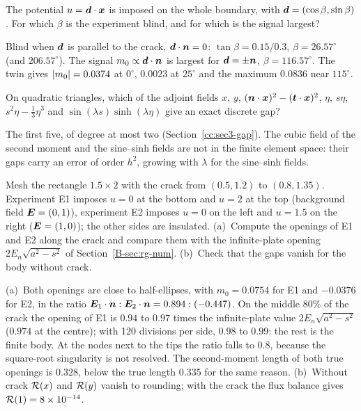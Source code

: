 \label{exo:cc-rg-q-blind}
%
The potential $u=\bm{d}\cdot\bm{x}$ is imposed on the whole boundary, with
$\bm{d}=(\cos\beta,\sin\beta)$. For which $\beta$ is the experiment blind, and for
which is the signal largest?
\begin{solution}
Blind when $\bm{d}$ is parallel to the crack, $\bm{d}\cdot\bm{n}=0$:
$\tan\beta=0.15/0.3$, $\beta=26.57^\circ$ (and $206.57^\circ$). The signal
$m_0\propto\bm{d}\cdot\bm{n}$ is largest for $\bm{d}=\pm\bm{n}$, $\beta=116.57^\circ$. The
twin gives $\lvert m_0\rvert=0.0374$ at $0^\circ$, $0.0023$ at $25^\circ$ and the
maximum $0.0836$ near $115^\circ$.
\end{solution}

\label{exo:cc-rg-q-exact}
%
On quadratic triangles, which of the adjoint fields $x$, $y$,
$(\bm{n}\cdot\bm{x})^2-(\bm{t}\cdot\bm{x})^2$, $\eta$, $s\eta$, $s^2\eta-\tfrac13\eta^3$ and
$\sin(\lambda s)\sinh(\lambda\eta)$ give an exact discrete gap?
\begin{solution}
The first five, of degree at most two (Section~\ref{cc:sec3-gap}). The cubic
field of the second moment and the sine--sinh fields are not in the
finite element space: their gaps carry an error of order $h^2$, growing with
$\lambda$ for the sine--sinh fields.
\end{solution}


\label{exo:cc-rg-direct}
%
Mesh the rectangle $1.5\times2$ with the crack from $(0.5,1.2)$ to
$(0.8,1.35)$. Experiment E1 imposes $u=0$ at the bottom and $u=2$ at the top
(background field $\bm{E}=(0,1)$), experiment E2 imposes $u=0$ on the left and
$u=1.5$ on the right ($\bm{E}=(1,0)$); the other sides are insulated. (a)~Compute
the openings of E1 and E2 along the crack and compare them with the
infinite-plate opening $2E_n\sqrt{a^2-s^2}$ of Section~\ref{B-sec:rg-num}.
(b)~Check that the gaps vanish for the body without crack.
\begin{solution}
(a)~Both openings are close to half-ellipses, with $m_0=0.0754$ for E1 and
$-0.0376$ for E2, in the ratio $\bm{E}_1\cdot\bm{n}:\bm{E}_2\cdot\bm{n}=0.894:(-0.447)$. On
the middle $80\%$ of the crack the opening of E1 is $0.94$ to $0.97$ times the
infinite-plate value $2E_n\sqrt{a^2-s^2}$ ($0.974$ at the centre); with 120
divisions per side, $0.98$ to $0.99$: the rest is the finite body. At the nodes
next to the tips the ratio falls to $0.8$, because the square-root singularity
is not resolved. The second-moment length of both true openings is $0.328$,
below the true length $0.335$ for the same reason.
(b)~Without crack $\mathcal{R}(x)$ and $\mathcal{R}(y)$ vanish to rounding; with the crack the
flux balance gives $\mathcal{R}(1)=8\times10^{-14}$.
\end{solution}

